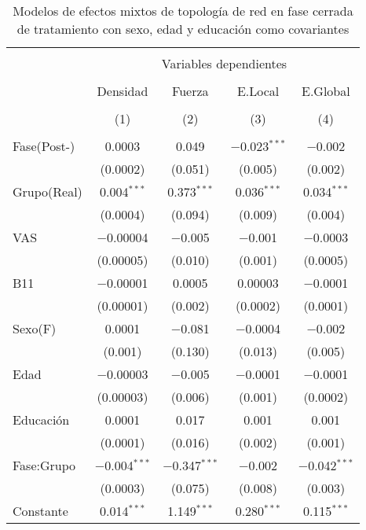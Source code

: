 \begin{table}[!htb] \centering
  \small
  \caption{Modelos de efectos mixtos de topología de red en fase cerrada de tratamiento con sexo, edad y educación como covariantes}
  \label{tab:memT1}
\begin{tabular}{@{\extracolsep{5pt}}lcccc}
\\[-1.8ex]\hline
\hline \\[-1.8ex]
 & \multicolumn{4}{c}{Variables dependientes} \\
\cline{2-5}
\\[-1.8ex] & Densidad & Fuerza & E.Local & E.Global \\
\\[-1.8ex] & (1) & (2) & (3) & (4)\\
\hline \\[-1.8ex]
 Fase(Post-) & 0.0003 & 0.049 & $-$0.023$^{***}$ & $-$0.002 \\
  & (0.0002) & (0.051) & (0.005) & (0.002) \\
  Grupo(Real) & 0.004$^{***}$ & 0.373$^{***}$ & 0.036$^{***}$ & 0.034$^{***}$ \\
  & (0.0004) & (0.094) & (0.009) & (0.004) \\
  VAS & $-$0.00004 & $-$0.005 & $-$0.001 & $-$0.0003 \\
  & (0.00005) & (0.010) & (0.001) & (0.0005) \\
  B11 & $-$0.00001 & 0.0005 & 0.00003 & $-$0.0001 \\
  & (0.00001) & (0.002) & (0.0002) & (0.0001) \\
  Sexo(F) & 0.0001 & $-$0.081 & $-$0.0004 & $-$0.002 \\
  & (0.001) & (0.130) & (0.013) & (0.005) \\
  Edad & $-$0.00003 & $-$0.005 & $-$0.0001 & $-$0.0001 \\
  & (0.00003) & (0.006) & (0.001) & (0.0002) \\
  Educación & 0.0001 & 0.017 & 0.001 & 0.001 \\
  & (0.0001) & (0.016) & (0.002) & (0.001) \\
  Fase:Grupo & $-$0.004$^{***}$ & $-$0.347$^{***}$ & $-$0.002 & $-$0.042$^{***}$ \\
  & (0.0003) & (0.075) & (0.008) & (0.003) \\
  Constante & 0.014$^{***}$ & 1.149$^{***}$ & 0.280$^{***}$ & 0.115$^{***}$ \\

\end{tabular}
\end{table}
